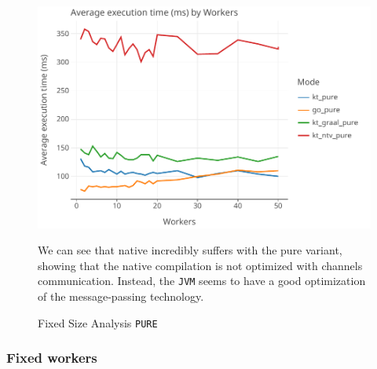 \begin{figure}[H]
	\centering
	\begin{minipage}{0.7\textwidth}
		\centering
		\includegraphics[width=\textwidth]{img/graphs/fixed_size_pure}
		\caption{Fixed Size Analysis \texttt{PURE}}
	\end{minipage}\hfill
	\begin{minipage}{0.25\textwidth}
		We can see that \Kotlin native incredibly suffers with the pure variant, showing that the native compilation is not optimized with channels communication. Instead, the \texttt{JVM} seems to have a good optimization of the message-passing technology. 
	\end{minipage}
\end{figure}

\subsubsection{Fixed workers}

